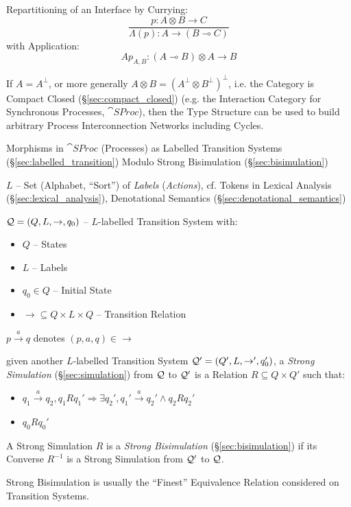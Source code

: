 Repartitioning of an Interface by Currying:
\[
  \frac{p:A \otimes B \rightarrow C}
  {\Lambda (p) : A \rightarrow (B \multimap C)}
\]
with Application:
\[
  Ap_{A,B} : (A \multimap B) \otimes A \rightarrow B
\]

If $A = A^\bot$, or more generally $A \otimes B = (A^\bot \otimes
B^\bot)^\bot$, i.e. the Category is Compact Closed
(\S\ref{sec:compact_closed}) (e.g. the Interaction Category for
Synchronous Processes, $\cat{SProc}$), then the Type Structure can be
used to build arbitrary Process Interconnection Networks including
Cycles.


\asterism


Morphisms in $\cat{SProc}$ (Processes) as Labelled Transition Systems
(\S\ref{sec:labelled_transition}) Modulo Strong Bisimulation
(\S\ref{sec:bisimulation})

$L$ -- Set (Alphabet, ``Sort'') of \emph{Labels} (\emph{Actions}), cf.
Tokens in Lexical Analysis (\S\ref{sec:lexical_analysis}),
Denotational Semantics (\S\ref{sec:denotational_semantics})

$\mathcal{Q} = (Q,L,\rightarrow,q_0)$ -- $L$-labelled Transition System
 with:
\begin{itemize}
  \item $Q$ -- States
  \item $L$ -- Labels
  \item $q_0 \in Q$ -- Initial State
  \item $\rightarrow \subseteq Q \times L \times Q$ -- Transition
    Relation
\end{itemize}

$p \xrightarrow{a} q$ denotes $(p,a,q) \in \rightarrow$

given another $L$-labelled Transition System $\mathcal{Q}' =
(Q',L,\rightarrow',q_0')$, a \emph{Strong Simulation}
(\S\ref{sec:simulation}) from $\mathcal{Q}$ to $\mathcal{Q}'$ is a
Relation $R \subseteq Q \times Q'$ such that:
\begin{itemize}
  \item $q_1 \xrightarrow{a} q_2, q_1 R q_1' \Rightarrow
    \exists q_2', q_1' \xrightarrow{a} q_2' \wedge q_2 R q_2'$
  \item $q_0 R q_0'$
\end{itemize}

A Strong Simulation $R$ is a \emph{Strong Bisimulation}
(\S\ref{sec:bisimulation}) if its Converse $R^{-1}$ is a Strong
Simulation from $\mathcal{Q}'$ to $\mathcal{Q}$.

Strong Bisimulation is usually the ``Finest'' Equivalence Relation
considered on Transition Systems.

